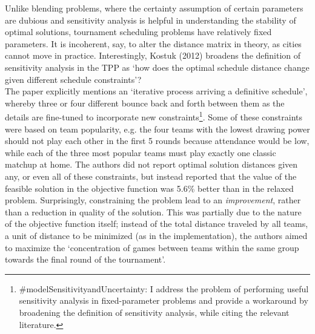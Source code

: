 \documentclass[twoside]{article}
\begin{document}
Unlike blending problems, where the certainty assumption of certain parameters are dubious and sensitivity analysis is helpful in understanding the stability of optimal solutions, tournament scheduling problems have relatively fixed parameters. It is incoherent, say, to alter the distance matrix in theory, as cities cannot move in practice. Interestingly, Kostuk (2012) broadens the definition of sensitivity analysis in the TPP as `how does the optimal schedule distance change given different schedule constraints'? \\

The paper explicitly mentions an `iterative process arriving a definitive schedule', whereby three or four different bounce back and forth between them as the details are fine-tuned to incorporate new constraints\footnote{\#modelSensitivityandUncertainty: I address the problem of performing useful sensitivity analysis in fixed-parameter problems and provide a workaround by broadening the definition of sensitivity analysis, while citing the relevant literature.}. Some of these constraints were based on team popularity, e.g. the four teams with the lowest drawing power should not play each other in the first 5 rounds because attendance would be low, while each of the three most popular teams must play exactly one classic matchup at home. The authors did not report optimal solution distances given any, or even all of these constraints, but instead reported that the value of the feasible solution in the objective function was 5.6\% better than in the relaxed problem. Surprisingly, constraining the problem lead to an \textit{improvement}, rather than a reduction in quality of the solution. This was partially due to the nature of the objective function itself; instead of the total distance traveled by all teams, a unit of distance to be minimized (as in the implementation), the authors aimed to maximize the `concentration of games between teams within the same group towards the final round of the tournament'.
\end{document}

